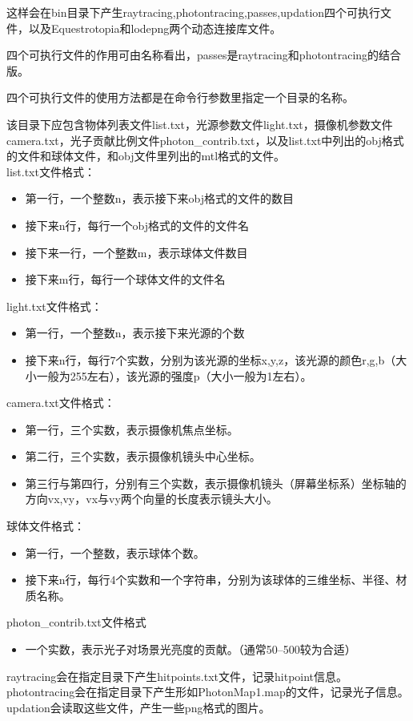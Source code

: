 \documentclass[a4paper,12pt]{article}
\theoremstyle{plain}
\numberwithin{thmdef}{section}
\begin{document}
这样会在bin目录下产生raytracing,photontracing,passes,updation四个可执行文件，以及Equestrotopia和lodepng两个动态连接库文件。\par
四个可执行文件的作用可由名称看出，passes是raytracing和photontracing的结合版。\par
四个可执行文件的使用方法都是在命令行参数里指定一个目录的名称。\par
该目录下应包含物体列表文件list.txt，光源参数文件light.txt，摄像机参数文件camera.txt，光子贡献比例文件photon\_contrib.txt，以及list.txt中列出的obj格式的文件和球体文件，和obj文件里列出的mtl格式的文件。\\
list.txt文件格式：
\begin{itemize}
    \small \setlength{\itemsep}{.1em}
    \item 第一行，一个整数n，表示接下来obj格式的文件的数目
    \item 接下来n行，每行一个obj格式的文件的文件名
    \item 接下来一行，一个整数m，表示球体文件数目
    \item 接下来m行，每行一个球体文件的文件名
\end{itemize}
light.txt文件格式：
\begin{itemize}
    \small \setlength{\itemsep}{.1em}
    \item 第一行，一个整数n，表示接下来光源的个数
    \item 接下来n行，每行7个实数，分别为该光源的坐标x,y,z，该光源的颜色r,g,b（大小一般为255左右），该光源的强度p（大小一般为1左右）。
\end{itemize}
camera.txt文件格式：
\begin{itemize}
    \small \setlength{\itemsep}{.1em}
    \item 第一行，三个实数，表示摄像机焦点坐标。
    \item 第二行，三个实数，表示摄像机镜头中心坐标。
    \item 第三行与第四行，分别有三个实数，表示摄像机镜头（屏幕坐标系）坐标轴的方向vx,vy，vx与vy两个向量的长度表示镜头大小。
\end{itemize}
球体文件格式：
\begin{itemize}
    \small \setlength{\itemsep}{.1em}
    \item 第一行，一个整数，表示球体个数。
    \item 接下来n行，每行4个实数和一个字符串，分别为该球体的三维坐标、半径、材质名称。
\end{itemize}
photon\_contrib.txt文件格式
\begin{itemize}
    \small \setlength{\itemsep}{.1em}
    \item 一个实数，表示光子对场景光亮度的贡献。（通常50--500较为合适）
\end{itemize}
raytracing会在指定目录下产生hitpoints.txt文件，记录hitpoint信息。\\
photontracing会在指定目录下产生形如PhotonMap1.map的文件，记录光子信息。\\
updation会读取这些文件，产生一些png格式的图片。
\end{document}
